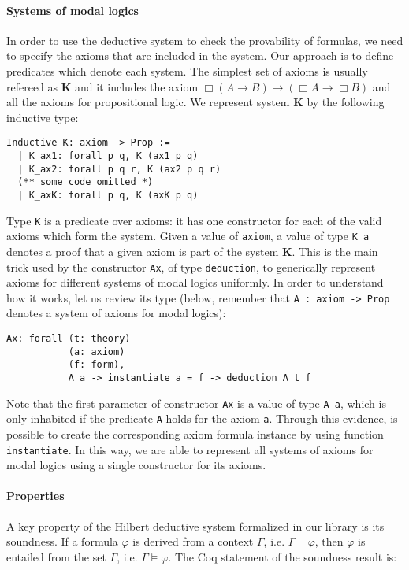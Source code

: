 \documentclass[sigconf]{acmart}
\begin{document}
\paragraph{Systems of modal logics} In order to use the deductive system to
check the provability of formulas, we need to specify the axioms that are
included in the system. Our approach is to define predicates
which denote each system. The simplest set of axioms is usually refereed as
\textbf{K} and it includes the axiom $\Box(A \to B) \to (\Box A \to \Box B)$
and all the axioms for propositional logic. We represent system \textbf{K}
by the following inductive type:
\begin{verbatim}
Inductive K: axiom -> Prop :=
  | K_ax1: forall p q, K (ax1 p q)
  | K_ax2: forall p q r, K (ax2 p q r)
  (** some code omitted *)
  | K_axK: forall p q, K (axK p q)
\end{verbatim}
Type \texttt{K} is a predicate over axioms: it has one constructor for
each of the valid axioms which form the system. Given a value
of \texttt{axiom}, a value of type \texttt{K a} denotes a
proof that a given axiom is part of the system \textbf{K}. This is the main
trick used by the constructor \texttt{Ax}, of type
\texttt{deduction}, to generically represent axioms for
different systems of modal logics uniformly. In order to understand how it
works, let us review its type (below, remember that \texttt{A : axiom -> Prop}
denotes a system of axioms for modal logics):
\begin{verbatim}
Ax: forall (t: theory)
           (a: axiom)
           (f: form),
           A a -> instantiate a = f -> deduction A t f
\end{verbatim}
Note that the first parameter of constructor \texttt{Ax} is a value
of type \texttt{A a}, which is only inhabited if the predicate
\texttt{A} holds for the axiom \texttt{a}. Through this
evidence, is possible to create the corresponding axiom formula instance by
using function \texttt{instantiate}. In this way, we are able to
represent all systems of axioms for modal logics using a single constructor
for its axioms.

\paragraph{Properties} A key property of the Hilbert deductive system formalized
in our library is its soundness. If a formula $\varphi$ is derived from a
context $\Gamma$, i.e. $\Gamma\vdash\varphi$, then $\varphi$ is entailed from
the set $\Gamma$, i.e. $\Gamma\models\varphi$. The Coq statement of the soundness
result is:
\end{document}
